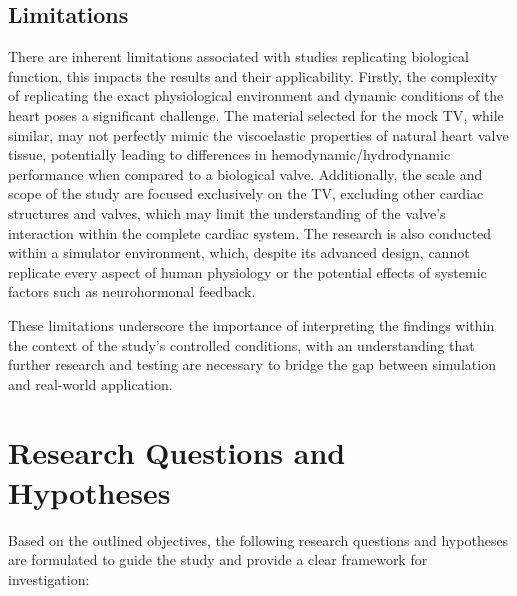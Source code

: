 \subsection{Limitations}

There are inherent limitations associated with studies replicating biological function, this impacts the results and their applicability. Firstly, the complexity of replicating the exact physiological environment and dynamic conditions of the heart poses a significant challenge. The material selected for the mock \gls{TV}, while similar, may not perfectly mimic the viscoelastic properties of natural heart valve tissue, potentially leading to differences in hemodynamic/hydrodynamic performance when compared to a biological valve. Additionally, the scale and scope of the study are focused exclusively on the \gls{TV}, excluding other cardiac structures and valves, which may limit the understanding of the valve's interaction within the complete cardiac system. The research is also conducted within a simulator environment, which, despite its advanced design, cannot replicate every aspect of human physiology or the potential effects of systemic factors such as neurohormonal feedback. 

These limitations underscore the importance of interpreting the findings within the context of the study's controlled conditions, with an understanding that further research and testing are necessary to bridge the gap between simulation and real-world application.

\section{Research Questions and Hypotheses}

Based on the outlined objectives, the following research questions and hypotheses are formulated to guide the study and provide a clear framework for investigation:


